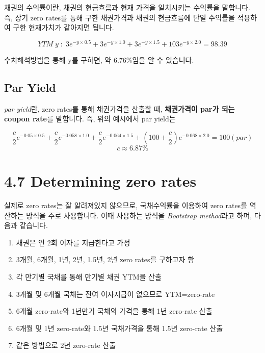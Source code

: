 \documentclass[
  letterpaper,
  DIV=11,
  numbers=noendperiod]{scrreprt}
\providecommand{\tightlist}{%
  \setlength{\itemsep}{0pt}\setlength{\parskip}{0pt}}\usepackage{longtable,booktabs,array}
\begin{document}
채권의 수익률이란, 채권의 현금흐름과 현재 가격을 일치시키는 수익률을
말합니다. 즉, 상기 zero rates를 통해 구한 채권가격과 채권의 현금흐름에
단일 수익률을 적용하여 구한 현재가치가 같아지면 됩니다.

\[YTM\; y\; :\; 3e^{-y\times 0.5}+3e^{-y\times 1.0}+3e^{-y\times 1.5}+103e^{-y\times 2.0}=98.39\]

수치해석방법을 통해 y를 구하면, 약 6.76\%임을 알 수 있습니다.

\subsection*{Par Yield}\label{par-yield}

\emph{par yield}란, zero rates를 통해 채권가격을 산출할 때,
\textbf{채권가격이 par가 되는 coupon rate}를 말합니다. 즉, 위의 예시에서
par yield는

\[\frac{c}{2}e^{-0.05\times 0.5}+\frac{c}{2}e^{-0.058\times 1.0}+\frac{c}{2}e^{-0.064\times 1.5}+(100+\frac{c}{2})e^{-0.068\times 2.0}=100(par)\]
\[c\approx 6.87\%\]

\section*{4.7 Determining zero rates}\label{determining-zero-rates}


실제로 zero rates는 잘 알려져있지 않으므로, 국채수익률을 이용하여 zero
rates를 역산하는 방식을 주로 사용합니다. 이때 사용하는 방식을
\emph{Bootstrap method}라고 하며, 다음과 같습니다.

\begin{enumerate}
\def\labelenumi{\arabic{enumi}.}
\tightlist
\item
  채권은 연 2회 이자를 지급한다고 가정
\item
  3개월, 6개월, 1년, 2년, 1.5년, 2년 zero rates를 구하고자 함
\item
  각 만기별 국채를 통해 만기별 채권 YTM을 산출
\item
  3개월 및 6개월 국채는 잔여 이자지급이 없으므로 YTM=zero-rate
\item
  6개월 zero-rate와 1년만기 국채의 가격을 통해 1년 zero-rate 산출
\item
  6개월 및 1년 zero-rate와 1.5년 국채가격을 통해 1.5년 zero-rate 산출
\item
  같은 방법으로 2년 zero-rate 산출
\end{enumerate}
\end{document}
